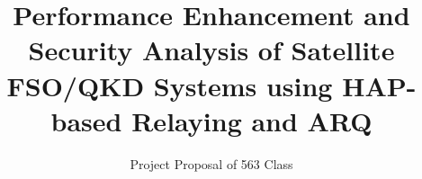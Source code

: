 \documentclass[12pt,onecolumn,letterpaper]{IEEEtran}
\begin{document}
\title{\bf Performance Enhancement and Security Analysis of Satellite FSO/QKD Systems using HAP-based Relaying and ARQ}

\author{Project Proposal of 563 Class\\
}

\maketitle
\thispagestyle{plain}
\pagestyle{plain}

%

\end{document}
